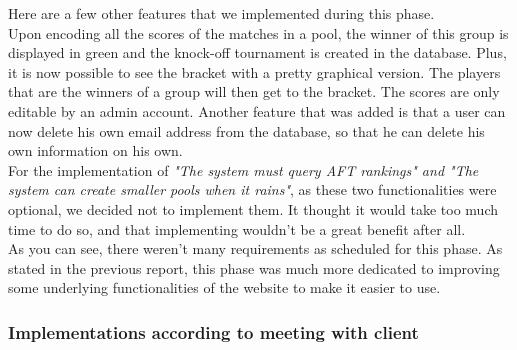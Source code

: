 \documentclass[a4paper, 12pt]{article}
\begin{document}
Here are a few other features that we implemented during this phase. \\

Upon encoding all the scores of the matches in a pool, the winner of this group is displayed in green and the knock-off tournament is created in the database. Plus, it is now possible to see the bracket with a pretty graphical version. The players that are the winners of a group will then get to the bracket. The scores are only editable by an admin account. Another feature that was added is that a user can now delete his own email address from the database, so that he can delete his own information on his own.\\

For the implementation of \textit{"The system must query AFT rankings" and "The system can create smaller pools when it rains"}, as these two functionalities were optional, we decided not to implement them. It thought it would take too much time to do so, and that implementing wouldn't be a great benefit after all.\\

As you can see, there weren't many requirements as scheduled for this phase. As stated in the previous report, this phase was much more dedicated to improving some underlying functionalities of the website to make it easier to use.

\subsubsection*{Implementations according to meeting with client}
\end{document}

